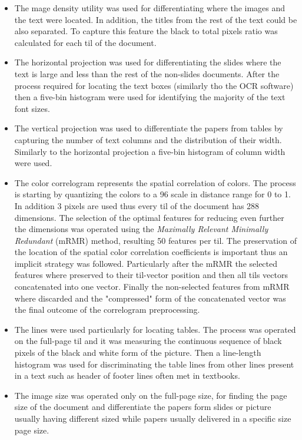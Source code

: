 \begin{itemize}
	\item The mage density utility was used for differentiating where the images and the text were located. In addition, the titles from the rest of the text could be also separated. To capture this feature the black to total pixels ratio was calculated for each til of the document.  
	\item The horizontal projection was used for differentiating the slides where the text is large and less than the rest of the non-slides documents. After the process required for locating the text boxes (similarly tho the OCR software) then a five-bin histogram were used for identifying the majority of the text font sizes.
	\item The vertical projection was used to differentiate the papers from tables by capturing the number of text columns and the distribution of their width. Similarly to the horizontal projection a five-bin histogram of column width were used.
	\item The color correlogram represents the spatial correlation of colors. The process is starting by quantizing the colors to a 96 scale in distance range for 0 to 1. In addition 3 pixels are used thus every til of the document has 288 dimensions. The selection of the optimal features for reducing even further the dimensions was operated using the \textit{Maximally Relevant Minimally Redundant} (mRMR) method, resulting 50 features per til. The preservation of the location of the spatial color correlation coefficients is important thus an implicit strategy was followed. Particularly after the mRMR the selected features where preserved to their til-vector position and then all tils vectors concatenated into one vector. Finally the non-selected features from mRMR where discarded and the "compressed" form of the concatenated vector was the final outcome of the correlogram preprocessing.
	\item The lines were used particularly for locating tables. The process was operated on the full-page til and it was measuring the continuous sequence of black pixels of the black and white form of the picture. Then a line-length histogram was used for discriminating the table lines from other lines present in a text such as header of footer lines often met in textbooks.
	\item The image size was operated only on the full-page size, for finding the page size of the document and differentiate the papers form slides or picture usually having different sized while papers usually delivered in a specific size page size.
\end{itemize}

